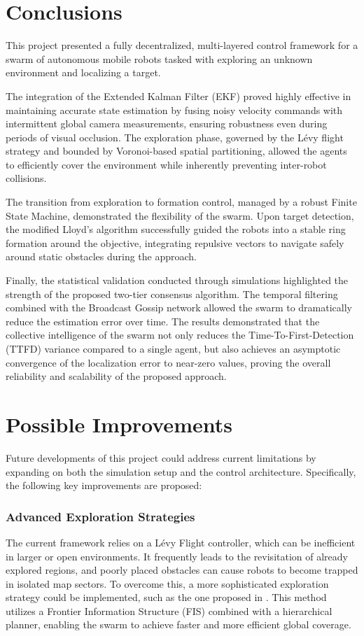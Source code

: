 \documentclass[times, twoside]{zHenriquesLab-StyleBioRxiv}
\begin{document}
\section*{Conclusions}
This project presented a fully decentralized, multi-layered control framework for a swarm of autonomous mobile robots tasked with exploring an unknown environment and localizing a target.

The integration of the Extended Kalman Filter (EKF) proved highly effective in maintaining accurate state estimation by fusing noisy velocity commands with intermittent global camera measurements, ensuring robustness even during periods of visual occlusion. The exploration phase, governed by the Lévy flight strategy and bounded by Voronoi-based spatial partitioning, allowed the agents to efficiently cover the environment while inherently preventing inter-robot collisions.

The transition from exploration to formation control, managed by a robust Finite State Machine, demonstrated the flexibility of the swarm. Upon target detection, the modified Lloyd's algorithm successfully guided the robots into a stable ring formation around the objective, integrating repulsive vectors to navigate safely around static obstacles during the approach.

Finally, the statistical validation conducted through simulations highlighted the strength of the proposed two-tier consensus algorithm. The temporal filtering combined with the Broadcast Gossip network allowed the swarm to dramatically reduce the estimation error over time. The results demonstrated that the collective intelligence of the swarm not only reduces the Time-To-First-Detection (TTFD) variance compared to a single agent, but also achieves an asymptotic convergence of the localization error to near-zero values, proving the overall reliability and scalability of the proposed approach.


\section*{Possible Improvements}

Future developments of this project could address current limitations by expanding on both the simulation setup and the control architecture. Specifically, the following key improvements are proposed:

\subsubsection*{Advanced Exploration Strategies}
The current framework relies on a Lévy Flight controller, which can be inefficient in larger or open environments. It frequently leads to the revisitation of already explored regions, and poorly placed obstacles can cause robots to become trapped in isolated map sectors. To overcome this, a more sophisticated exploration strategy could be implemented, such as the one proposed in \cite{zhou2021fuel}. This method utilizes a Frontier Information Structure (FIS) combined with a hierarchical planner, enabling the swarm to achieve faster and more efficient global coverage.
\end{document}
